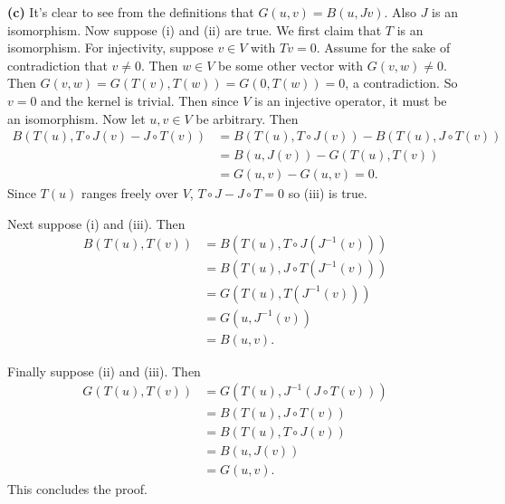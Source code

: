 \textbf{(c)} It's clear to see from the definitions that $G(u,v)=B(u,Jv)$. Also $J$ is an isomorphism. Now suppose (i) and (ii) are true. We first claim that $T$ is an isomorphism. For injectivity, suppose $v\in V$ with $Tv=0$. Assume for the sake of contradiction that $v\neq 0$. Then $w\in V$ be some other vector with $G(v,w)\neq 0$. Then $G(v,w)=G(T(v),T(w))=G(0, T(w))=0$, a contradiction. So $v=0$ and the kernel is trivial. Then since $V$ is an injective operator, it must be an isomorphism. Now let $u,v\in V$ be arbitrary. Then
\[
  \begin{aligned}
    B(T(u), T\circ J(v)-J\circ T(v))&= B(T(u), T\circ J(v))-B(T(u), J\circ T(v))\\
    &=B(u, J(v))-G(T(u), T(v))\\
    &=G(u, v)-G(u,v)=0.
  \end{aligned}
\]  
Since $T(u)$ ranges freely over $V$, $T\circ J-J\circ T=0$ so (iii) is true.

Next suppose (i) and (iii). Then
\[
  \begin{aligned}
    B(T(u), T(v))&=B(T(u), T\circ J(J^{-1}(v)))\\
    &=B(T(u), J\circ T(J^{-1}(v)))\\
    &=G(T(u), T(J^{-1}(v)))\\
    &=G(u, J^{-1}(v))\\
    &=B(u,v).
  \end{aligned}
\]

Finally suppose (ii) and (iii). Then
\[
  \begin{aligned}
    G(T(u), T(v))&=G(T(u), J^{-1}(J\circ T(v)))\\
    &=B(T(u), J\circ T(v))\\
    &=B(T(u), T\circ J(v))\\
    &=B(u, J(v))\\
    &=G(u,v).
  \end{aligned}
\] 
This concludes the proof.